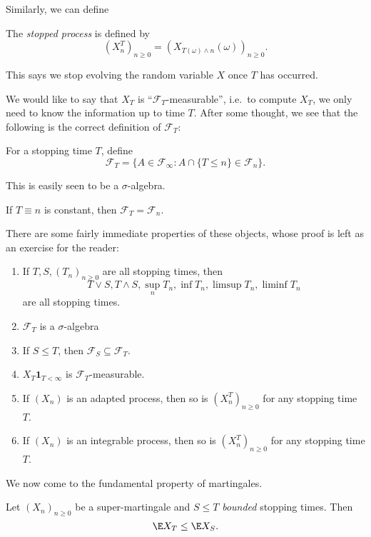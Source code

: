 \documentclass[a4paper]{article}
\begin{document}
Similarly, we can define
\begin{defi}
  The \emph{stopped process} is defined by
  \[
    (X_n^T)_{n \geq 0} = (X_{T(\omega) \wedge n}(\omega))_{n \geq 0}.
  \]
\end{defi}
This says we stop evolving the random variable $X$ once $T$ has occurred.

We would like to say that $X_T$ is ``$\mathcal{F}_T$-measurable'', i.e.\ to compute $X_T$, we only need to know the information up to time $T$. After some thought, we see that the following is the correct definition of $\mathcal{F}_T$:
\begin{defi}[$\mathcal{F}_T$]
  For a stopping time $T$, define
  \[
    \mathcal{F}_T = \{A \in \mathcal{F}_\infty : A \cap \{T \leq n\} \in \mathcal{F}_n\}.
  \]
\end{defi}
This is easily seen to be a $\sigma$-algebra.

\begin{eg}
  If $T \equiv n$ is constant, then $\mathcal{F}_T = \mathcal{F}_n$.
\end{eg}

There are some fairly immediate properties of these objects, whose proof is left as an exercise for the reader:
\begin{prop}\leavevmode
  \begin{enumerate}
    \item If $T, S, (T_n)_{n \geq 0}$ are all stopping times, then
      \[
        T \vee S, T \wedge S, \sup_n T_n, \inf T_n, \limsup T_n, \liminf T_n
      \]
      are all stopping times.
    \item $\mathcal{F}_T$ is a $\sigma$-algebra
    \item If $S \leq T$, then $\mathcal{F}_S \subseteq \mathcal{F}_T$.
    \item $X_T \mathbf{1}_{T < \infty}$ is $\mathcal{F}_T$-measurable.
    \item If $(X_n)$ is an adapted process, then so is $(X^T_n)_{n \geq 0}$ for any stopping time $T$.
    \item If $(X_n)$ is an integrable process, then so is $(X^T_n)_{n \geq 0}$ for any stopping time $T$.\fakeqed
  \end{enumerate}
\end{prop}

We now come to the fundamental property of martingales.
\begin{thm}
  Let $(X_n)_{n \geq 0}$ be a super-martingale and $S \leq T$ \emph{bounded} stopping times. Then
  \[
    \E X_T \leq \E X_S.
  \]
\end{thm}
\end{document}
